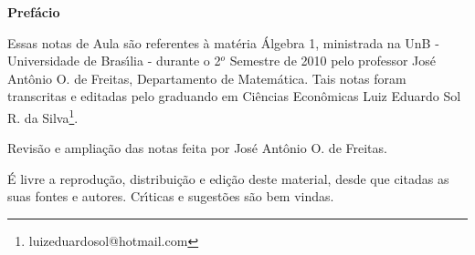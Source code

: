 \begin{center}
\Huge \textbf{Pref{\'a}cio}
\end{center}

Essas notas de Aula s{\~a}o referentes {\`a} mat{\'e}ria {\'A}lgebra 1,
ministrada na UnB - Universidade de Bras{\'\i}lia - durante o 2$^o$ Semestre de 2010
pelo professor Jos{\'e} Ant{\^o}nio O. de Freitas, Departamento de Matem{\'a}tica. Tais
notas foram transcritas e editadas pelo graduando em Ci{\^e}ncias Econ{\^o}micas
Luiz Eduardo Sol R. da Silva\footnote{luizeduardosol@hotmail.com}.

Revisão e ampliação das notas feita por José Antônio O. de Freitas.


{\'E} livre a reprodu{\c c}{\~a}o, distribui{\c c}{\~a}o e edi{\c c}{\~a}o deste material, desde que citadas as suas fontes e autores. Cr{\'\i}ticas e sugest{\~o}es s{\~a}o bem vindas.
\vspace{20cm}






